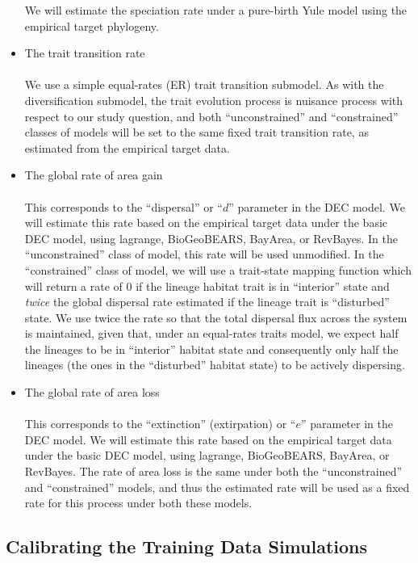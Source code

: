 \documentclass[11pt,openany]{memoir} %
\begin{document}
\begin{itemize}
        We will estimate the speciation rate under a pure-birth Yule model using the empirical target phylogeny.
    \item The trait transition rate \hfill \\
        \\
        We use a simple equal-rates (ER) trait transition submodel.
        As with the diversification submodel, the trait evolution process is nuisance process with respect to our study question, and both ``unconstrained'' and ``constrained'' classes of models will be set to the same fixed trait transition rate, as estimated from the empirical target data.
    \item The global rate of area gain \hfill \\
        \\
        This corresponds to the ``dispersal'' or ``$d$'' parameter in the DEC model.
        We will estimate this rate based on the empirical target data under the basic DEC model, using lagrange, BioGeoBEARS, BayArea, or RevBayes.
        In the ``unconstrained'' class of model, this rate will be used unmodified.
        In the ``constrained'' class of model, we will use a trait-state mapping function which will return a rate of $0$ if the lineage habitat trait is in ``interior'' state and \textit{twice} the global dispersal rate estimated if the lineage trait is ``disturbed'' state.
        We use twice the rate so that the total dispersal flux across the system is maintained, given that, under an equal-rates traits model, we expect half the lineages to be in ``interior'' habitat state and consequently only half the lineages (the ones in the ``disturbed'' habitat state) to be actively dispersing.
    \item The global rate of area loss \hfill \\
        \\
        This corresponds to the ``extinction'' (extirpation) or ``$e$'' parameter in the DEC model.
        We will estimate this rate based on the empirical target data under the basic DEC model, using lagrange, BioGeoBEARS, BayArea, or RevBayes.
        The rate of area loss is the same under both the ``unconstrained'' and ``constrained'' models, and thus the estimated rate will be used as a fixed rate for this process under both these models.

\end{itemize}

\subsection{Calibrating the Training Data Simulations}
\end{document}
